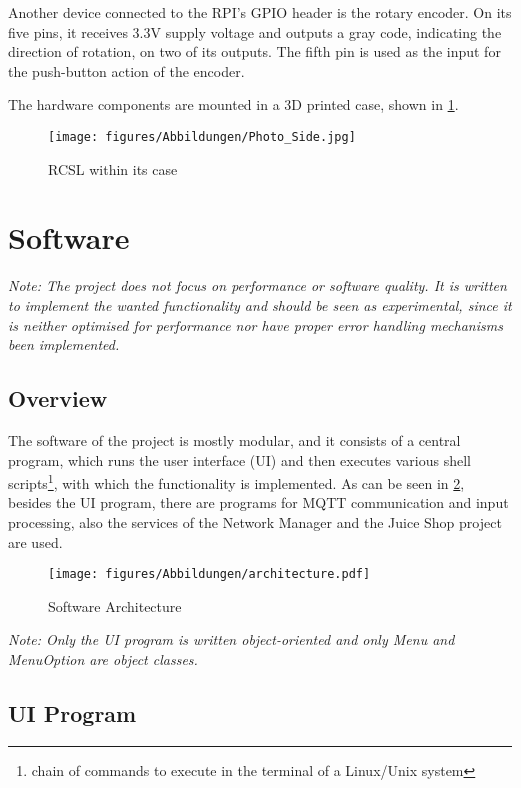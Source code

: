 Another device connected to the RPI's GPIO header is the rotary encoder.
On its five pins, it receives 3.3V supply voltage and outputs a gray code, indicating the direction of rotation, on two of its outputs. 
The fifth pin is used as the input for the push-button action of the encoder.

The hardware components are mounted in a 3D printed case, shown in \cref{fig:RCSL_side}.
\begin{figure}[h]
    \centering
    \texttt{[image: figures/Abbildungen/Photo\_Side.jpg]}
    \caption{RCSL within its case}
    \label{fig:RCSL_side}
\end{figure}

\newpage
\section{Software}

\textit{Note: The project does not focus on performance or software quality.
It is written to implement the wanted functionality and should be seen as experimental, since it is neither optimised for performance nor have proper error handling mechanisms been implemented.}

\subsection{Overview}
The software of the project is mostly modular, and it consists of a central program, which runs the user interface (UI) and then executes various shell scripts\footnote{chain of commands to execute in the terminal of a Linux/Unix system}, with which the functionality is implemented.
As can be seen in \cref{fig:architecture}, besides the UI program, there are programs for MQTT communication and input processing, also the services of the Network Manager and the Juice Shop project are used. 

\begin{figure}[h]
    \texttt{[image: figures/Abbildungen/architecture.pdf]}
    \centering
    \caption{Software Architecture}
    \label{fig:architecture}
\end{figure}

\textit{Note: Only the UI program is written object-oriented and only Menu and MenuOption are object classes.}


\subsection{UI Program}

